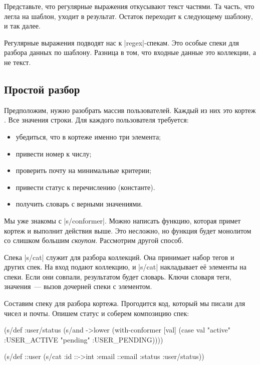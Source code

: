 Представьте, что регулярные выражения откусывают текст частями. Та часть, что
легла на шаблон, уходит в результат. Остаток переходит к следующему шаблону, и
так далее.

Регулярные выражения подводят нас к \spverb|regex|-спекам. Это особые спеки для
разбора данных по шаблону. Разница в том, что входные данные это коллекции, а не
текст.


\subsection{Простой разбор}

Предположим, нужно разобрать массив пользователей. Каждый из них это кортеж
. Все значения строки. Для каждого пользователя
требуется:

\begin{itemize}

\item
  убедиться, что в кортеже именно три элемента;

\item
  привести номер к числу;

\item
  проверить почту на минимальные критерии;

\item
  привести статус к перечислению (константе).

\item
  получить словарь с верными значениями.

\end{itemize}

Мы уже знакомы с \spverb|s/conformer|. Можно написать функцию, которая примет
кортеж и выполнит действия выше. Это несложно, но функция будет монолитом со
слишком большим \emph{скоупом}. Рассмотрим другой способ.


Спека \spverb|s/cat| служит для разбора коллекций. Она принимает набор тегов и
других спек. На вход подают коллекцию, и \spverb|s/cat| накладывает е\"{е} элементы
на спеки. Если они совпали, результатом будет словарь. Ключи словаря теги,
значения~--- вызов дочерней спеки с элементом.

Составим спеку для разбора кортежа. Прогодится код, который мы писали для чисел
и почты. Опишем статус и соберем композицию спек:

\begin{english}
  \begin{clojure}
(s/def :user/status
  (s/and ->lower
         (with-conformer [val]
           (case val
             "active"  :USER_ACTIVE
             "pending" :USER_PENDING))))

(s/def ::user
  (s/cat :id ::->int
         :email ::email
         :status :user/status))
  \end{clojure}
\end{english}

